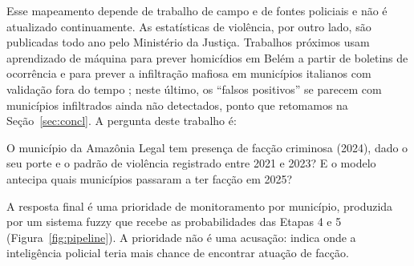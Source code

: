 \documentclass[article,12pt,oneside,a4paper,brazil,sumario=tradicional]{abntex2}
\begin{document}
Esse mapeamento depende de trabalho de campo e de fontes policiais e não é atualizado
continuamente. As estatísticas de violência, por outro lado, são publicadas todo ano pelo
Ministério da Justiça. Trabalhos próximos usam aprendizado de máquina para prever
homicídios em Belém a partir de boletins de ocorrência \cite{r16} e para prever a
infiltração mafiosa em municípios italianos com validação fora do tempo \cite{r17}; neste
último, os ``falsos positivos'' se parecem com municípios infiltrados ainda não detectados,
ponto que retomamos na Seção~\ref{sec:concl}. A pergunta deste trabalho é:

\begin{citacao}
O município da Amazônia Legal tem presença de facção criminosa (2024), dado o seu porte e
o padrão de violência registrado entre 2021 e 2023? E o modelo antecipa quais municípios
passaram a ter facção em 2025?
\end{citacao}

A resposta final é uma prioridade de monitoramento por município, produzida por um sistema
fuzzy que recebe as probabilidades das Etapas 4 e 5 (Figura~\ref{fig:pipeline}). A
prioridade não é uma acusação: indica onde a inteligência policial teria mais chance de
encontrar atuação de facção.
\end{document}
